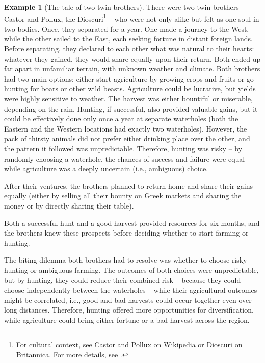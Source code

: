 \documentclass{article}
\theoremstyle{definition}
\newtheorem*{example}{Example}
\begin{document}
\begin{example}[The tale of two twin brothers]
There were two twin brothers -- Castor and Pollux, the Dioscuri\footnote{For cultural context, see Castor and Pollux on \href{https://en.wikipedia.org/wiki/Castor_and_Pollux}{Wikipedia} or Dioscuri on \href{https://www.britannica.com/topic/Dioscuri}{Britannica}. For more details, see \cite{book:Diascuri}.} -- who were not only alike but felt as one soul in two bodies.
Once, they separated for a year.
One made a journey to the West, while the other sailed to the East, each seeking fortune in distant foreign lands.
Before separating, they declared to each other what was natural to their hearts: whatever they gained, they would share equally upon their return.
Both ended up far apart in unfamiliar terrain, with unknown weather and climate. Both brothers had two main options: either start agriculture by growing crops and fruits or go hunting for boars or other wild beasts.
Agriculture could be lucrative, but yields were highly sensitive to weather. The harvest was either bountiful or miserable, depending on the rain.
Hunting, if successful, also provided valuable gains, but it could be effectively done only once a year at separate waterholes (both the Eastern and the Western locations had exactly two waterholes). However, the pack of thirsty animals did not prefer either drinking place over the other, and the pattern it followed was unpredictable. Therefore, hunting was risky -- by randomly choosing a waterhole, the chances of success and failure were equal -- while agriculture was a deeply uncertain (i.e., ambiguous) choice.

After their ventures, the brothers planned to return home and share their gains equally (either by selling all their bounty on Greek markets and sharing the money or by directly sharing their table).

Both a successful hunt and a good harvest provided resources for six months, and the brothers knew these prospects before deciding whether to start farming or hunting.

The biting dilemma both brothers had to resolve was whether to choose risky hunting or ambiguous farming. The outcomes of both choices were unpredictable, but by hunting, they could reduce their combined risk -- because they could choose independently between the waterholes -- while their agricultural outcomes might be correlated, i.e., good and bad harvests could occur together even over long distances.
Therefore, hunting offered more opportunities for diversification, while agriculture could bring either fortune or a bad harvest across the region.


\end{example}
\end{document}
